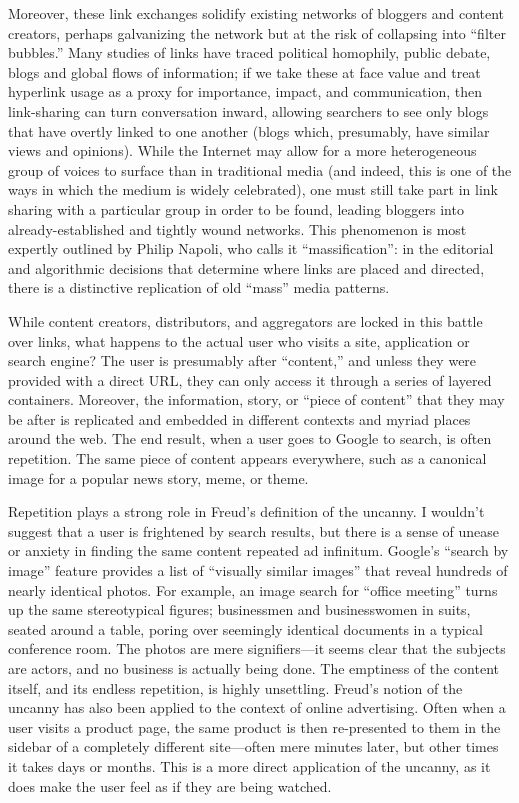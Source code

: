 Moreover, these link exchanges solidify existing networks of bloggers and content creators, perhaps galvanizing the network but at the risk of collapsing into ``filter bubbles.'' Many studies of links have traced political homophily, public debate, blogs and global flows of information; if we take these at face value and treat hyperlink usage as a proxy for importance, impact, and communication, then link-sharing can turn conversation inward, allowing searchers to see only blogs that have overtly linked to one another (blogs which, presumably, have similar views and opinions).  While the Internet may allow for a more heterogeneous group of voices to surface than in traditional media (and indeed, this is one of the ways in which the medium is widely celebrated), one must still take part in link sharing with a particular group in order to be found, leading bloggers into already-established and tightly wound networks. This phenomenon is most expertly outlined by Philip Napoli, who calls it ``massification'': in the editorial and algorithmic decisions that determine where links are placed and directed, there is a distinctive replication of old ``mass'' media patterns. 

While content creators, distributors, and aggregators are locked in this battle over links, what happens to the actual user who visits a site, application or search engine? The user is presumably after ``content,'' and unless they were provided with a direct URL, they can only access it through a series of layered containers. Moreover, the information, story, or ``piece of content'' that they may be after is replicated and embedded in different contexts and myriad places around the web. The end result, when a user goes to Google to search, is often repetition. The same piece of content appears everywhere, such as a canonical image for a popular news story, meme, or theme.

Repetition plays a strong role in Freud's definition of the uncanny. I wouldn't suggest that a user is frightened by search results, but there is a sense of unease or anxiety in finding the same content repeated ad infinitum. Google's ``search by image'' feature provides a list of ``visually similar images'' that reveal hundreds of nearly identical photos. For example, an image search for ``office meeting'' turns up the same stereotypical figures; businessmen and businesswomen in suits, seated around a table, poring over seemingly identical documents in a typical conference room. The photos are mere signifiers—it seems clear that the subjects are actors, and no business is actually being done. The emptiness of the content itself, and its endless repetition, is highly unsettling. Freud's notion of the uncanny has also been applied to the context of online advertising. Often when a user visits a product page, the same product is then re-presented to them in the sidebar of a completely different site—often mere minutes later, but other times it takes days or months. This is a more direct application of the uncanny, as it does make the user feel as if they are being watched. 

